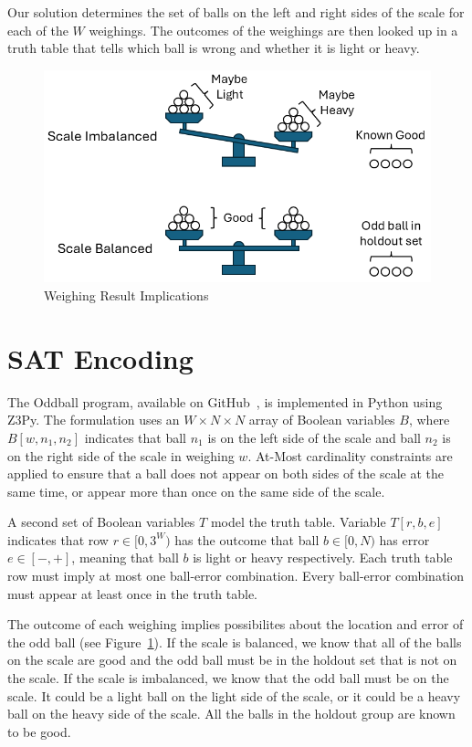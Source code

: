 \documentclass[conference]{IEEEtran}
\begin{document}
Our solution determines the set of balls on the left and right sides of the scale for each of the $W$ weighings.
The outcomes of the weighings are then looked up in a truth table that tells which ball is wrong and whether it is light or heavy.

\begin{figure}[!t]
\centerline{\includegraphics[width=\linewidth]{scale.png}}
\caption{Weighing Result Implications}
\label{scale}
\end{figure}

\section{SAT Encoding}

The Oddball program, available on GitHub~\cite{b1}, is implemented in Python using Z3Py.
The formulation uses an $W \times N \times N$ array of Boolean variables $B$,
where $B[w, n_1, n_2]$ indicates that ball $n_1$ is on the left side of the scale and ball $n_2$ is on the right side of the scale
in weighing $w$.
At\nobreakdash-Most cardinality constraints are applied to ensure that a ball does not appear on both sides of the scale
at the same time, or appear more than once on the same side of the scale.

A second set of Boolean variables $T$ model the truth table.
Variable $T[r, b, e]$ indicates that row $r \in [0, 3^W)$ has the outcome that ball $b \in [0, N)$ has error $e \in [-, +]$,
meaning that ball $b$ is light or heavy respectively.
Each truth table row must imply at most one ball-error combination.
Every ball-error combination must appear at least once in the truth table.

The outcome of each weighing implies possibilites about the location and error of the odd ball (see Figure~\ref{scale}).
If the scale is balanced, we know that all of the balls on the scale are good and the odd ball must be in the holdout set
that is not on the scale.
If the scale is imbalanced, we know that the odd ball must be on the scale.
It could be a light ball on the light side of the scale, or it could be a heavy ball on the heavy side of the scale.
All the balls in the holdout group are known to be good.
\end{document}
